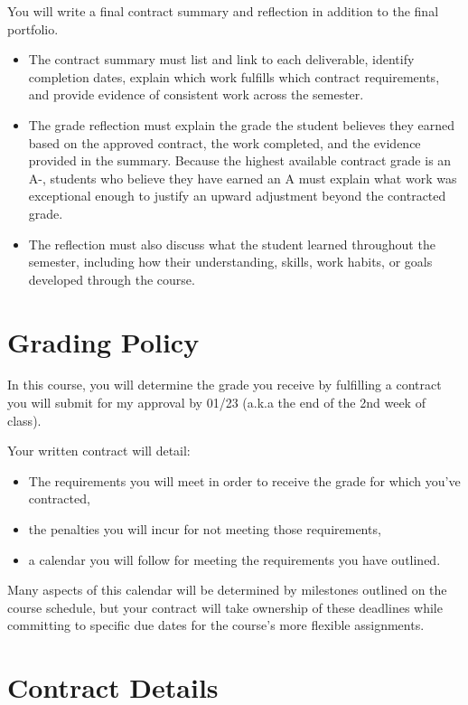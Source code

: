 \documentclass[
]{book}
\providecommand{\tightlist}{%
  \setlength{\itemsep}{0pt}\setlength{\parskip}{0pt}}
\begin{document}
You will write a final contract summary and reflection in addition to the final portfolio.

\begin{itemize}
\tightlist
\item
  The contract summary must list and link to each deliverable, identify completion dates, explain which work fulfills which contract requirements, and provide evidence of consistent work across the semester.
\item
  The grade reflection must explain the grade the student believes they earned based on the approved contract, the work completed, and the evidence provided in the summary. Because the highest available contract grade is an A-, students who believe they have earned an A must explain what work was exceptional enough to justify an upward adjustment beyond the contracted grade.
\item
  The reflection must also discuss what the student learned throughout the semester, including how their understanding, skills, work habits, or goals developed through the course.
\end{itemize}

\section*{Grading Policy}\label{grading-policy-5}


In this course, you will determine the grade you receive by fulfilling a contract you will submit for my approval by 01/23 (a.k.a the end of the 2nd week of class).

Your written contract will detail:

\begin{itemize}
\item
  The requirements you will meet in order to receive the grade for which you've contracted,
\item
  the penalties you will incur for not meeting those requirements,
\item
  a calendar you will follow for meeting the requirements you have outlined.
\end{itemize}

Many aspects of this calendar will be determined by milestones outlined on the course schedule, but your contract will take ownership of these deadlines while committing to specific due dates for the course's more flexible assignments.

\section*{Contract Details}\label{contract-details-1}
\end{document}
